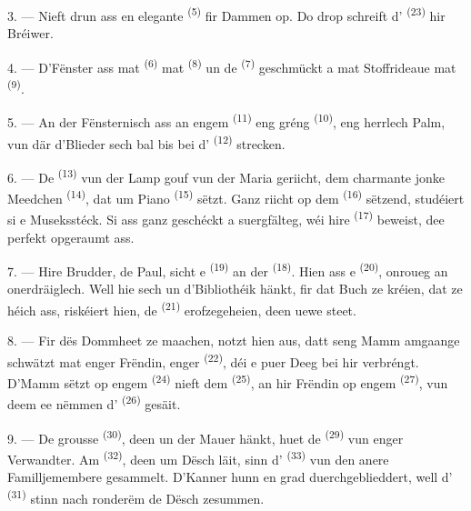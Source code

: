 3. --- Nieft drun ass en elegante  \textsuperscript{(5)} fir Dammen
op. Do drop schreift d' \textsuperscript{(23)} hir Bréiwer.

4. --- D'Fënster ass mat  \textsuperscript{(6)} mat
 \textsuperscript{(8)} un de  \textsuperscript{(7)}
geschmückt a mat Stoffrideaue mat 
\textsuperscript{(9)}.

5. --- An der Fënsternisch ass an engem 
\textsuperscript{(11)} eng gréng  \textsuperscript{(10)}, eng herrlech
Palm, vun där d'Blieder sech bal bis bei d'
\textsuperscript{(12)} strecken.

6. --- De  \textsuperscript{(13)} vun der Lamp gouf vun der
Maria geriicht, dem charmante jonke Meedchen \textsuperscript{(14)}, dat um Piano
\textsuperscript{(15)} sëtzt. Ganz riicht op dem 
\textsuperscript{(16)} sëtzend, studéiert si e Museksstéck. Si ass ganz geschéckt a
suergfälteg, wéi hire  \textsuperscript{(17)} beweist, dee perfekt
opgeraumt ass.

\VUsaut{5.0mm}
\VUsaut{3.0mm}

7. --- Hire Brudder, de Paul, sicht e  \textsuperscript{(19)} an der
 \textsuperscript{(18)}. Hien ass e 
\textsuperscript{(20)}, onroueg an onerdräiglech. Well hie sech un d'Bibliothéik
hänkt, fir dat Buch ze kréien, dat ze héich ass, riskéiert hien, de 
\textsuperscript{(21)} erofzegeheien, deen uewe steet.

8. --- Fir dës Dommheet ze maachen, notzt hien aus, datt seng Mamm amgaange schwätzt
mat enger Frëndin, enger  \textsuperscript{(22)}, déi e puer Deeg bei hir
verbréngt. D'Mamm sëtzt op engem  \textsuperscript{(24)} nieft dem
 \textsuperscript{(25)}, an hir Frëndin op engem 
\textsuperscript{(27)}, vun deem ee nëmmen d' \textsuperscript{(26)}
gesäit.

9. --- De grousse  \textsuperscript{(30)}, deen un der Mauer hänkt,
huet de  \textsuperscript{(29)} vun enger Verwandter. Am
 \textsuperscript{(32)}, deen um Dësch läit, sinn d'
\textsuperscript{(33)} vun den anere Familljemembere gesammelt. D'Kanner hunn en grad
duerchgeblieddert, well d' \textsuperscript{(31)} stinn nach ronderëm de
Dësch zesummen.

